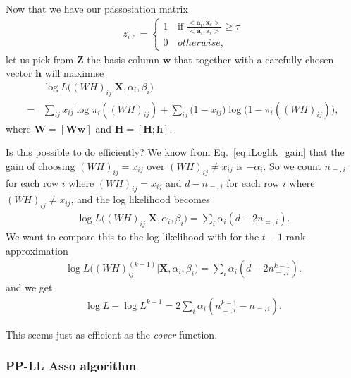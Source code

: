 \documentclass[12pt]{article}
\begin{document}
Now that we have our passosiation matrix
\begin{align} \label{eq:PAssociation}
  z_{i\ell} =
   \begin{cases}
      1 & \text{if }  \frac{<\mathbf{a}_i,\mathbf{x}_{\ell}>}{<\mathbf{a}_{i},\mathbf{a}_{i}>} \geq \tau \\
      0 \, &otherwise,
    \end{cases}
\end{align}
let us pick from $\mathbf{Z}$ the basis column $\mathbf{w}$ that together with a carefully chosen vector $\mathbf{h}$ will maximise
\begin{align}
 & \log L \big ((WH)_{ij}|\mathbf{X}, \alpha_{i}, \beta_{i} \big ) \\
 =& \sum_{i j}x_{ij} \log  \pi_i((WH)_{ij})+ \sum_{i j} \big (1 - x_{ij} \big)\log  \big ( 1 - \pi_i((WH)_{ij}) \big), \nonumber
\end{align}
where $\mathbf{W} = [\mathbf{W} \mathbf{w}]$ and  $\mathbf{H} = [\mathbf{H}; \mathbf{h}]$.

Is this possible to do efficiently?
We know from Eq.~\ref{eq:iLoglik_gain} that the gain of choosing $(WH)_{ij} = x_{ij}$ over $(WH)_{ij} \neq x_{ij}$ is $-\alpha_i$.
So we count $n_{=,i}$  for each row $i$ where $(WH)_{ij} = x_{ij}$ and $d- n_{=,i} $ for each row $i$ where  $(WH)_{ij} \neq x_{ij}$, and the log likelihood becomes
\begin{align}
 \log L \big ((WH)_{ij}|\mathbf{X}, \alpha_{i}, \beta_{i} \big ) =\sum_{i} \alpha_i (d - 2 n_{=,i}).
\end{align}
We want to compare this to the log likelihood with for the $t-1$ rank approximation
\begin{align}
 \log L \big ((WH)^{(k-1)}_{ij}|\mathbf{X}, \alpha_{i}, \beta_{i} \big ) =\sum_{i} \alpha_i (d - 2 n^{k-1}_{=,i}).
\end{align}
and we get
\begin{align}
 \log L - \log L^{k-1} = 2 \sum_{i} \alpha_i ( n^{k-1}_{=,i} - n_{=,i}).
\end{align}

This seems just as efficient as the {\it cover} function.

\subsubsection*{PP-LL Asso algorithm} %
\end{document}
